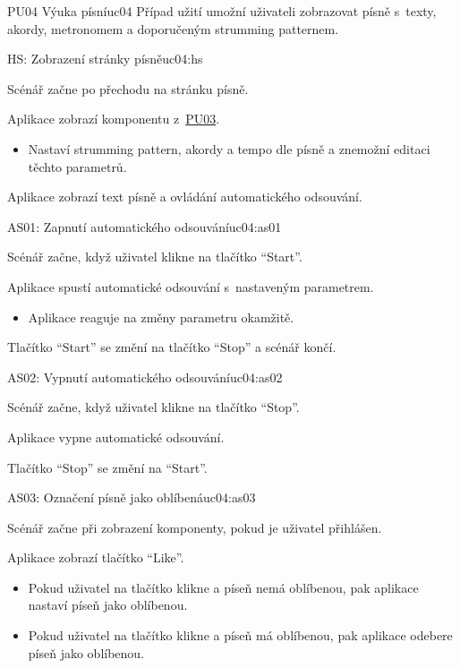 \begin{usecase}{PU04 Výuka písní}{uc04}
    Případ užití umožní uživateli zobrazovat písně s~texty, akordy, metronomem a doporučeným strumming patternem.

    \begin{scenario}{HS: Zobrazení stránky písně}{uc04:hs}
        \item Scénář začne po přechodu na stránku písně.
        \item Aplikace zobrazí komponentu z~\hyperref[uc03]{PU03}.
        \begin{itemize}
            \item Nastaví strumming pattern, akordy a tempo dle písně a znemožní editaci těchto parametrů.
        \end{itemize}
        \item Aplikace zobrazí text písně a ovládání automatického odsouvání.
    \end{scenario}

    \begin{scenario}{AS01: Zapnutí automatického odsouvání}{uc04:as01}
        \item Scénář začne, když uživatel klikne na tlačítko \enquote{Start}.
        \item Aplikace spustí automatické odsouvání s~nastaveným parametrem.
        \begin{itemize}
            \item Aplikace reaguje na změny parametru okamžitě.
        \end{itemize}
        \item Tlačítko \enquote{Start} se změní na tlačítko \enquote{Stop} a scénář končí.
    \end{scenario}

    \begin{scenario}{AS02: Vypnutí automatického odsouvání}{uc04:as02}
        \item Scénář začne, když uživatel klikne na tlačítko \enquote{Stop}.
        \item Aplikace vypne automatické odsouvání.
        \item Tlačítko \enquote{Stop} se změní na \enquote{Start}.
    \end{scenario}

    \begin{scenario}{AS03: Označení písně jako oblíbená}{uc04:as03}
        \item Scénář začne při zobrazení komponenty, pokud je uživatel přihlášen.
        \item Aplikace zobrazí tlačítko \enquote{Like}.
        \begin{itemize}
            \item Pokud uživatel na tlačítko klikne a píseň nemá oblíbenou, pak aplikace nastaví píseň jako oblíbenou.
            \item Pokud uživatel na tlačítko klikne a píseň má oblíbenou, pak aplikace odebere píseň jako oblíbenou.
        \end{itemize}
    \end{scenario}
\end{usecase}
